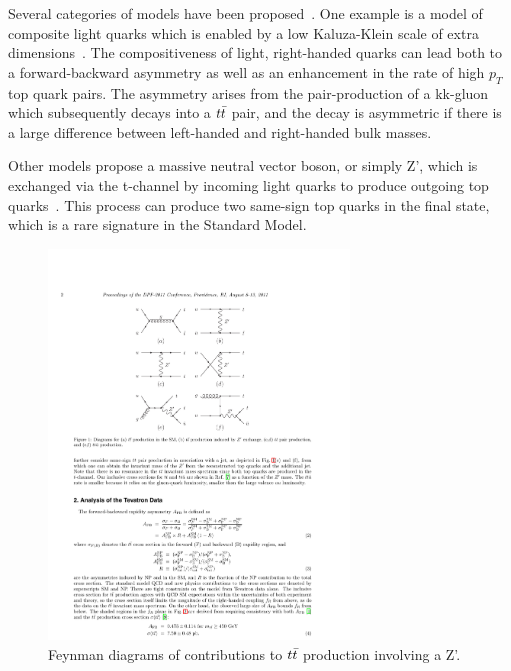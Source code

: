 Several categories of models have been proposed~\cite{Almeida:2008,Antunano:2008,Bowen:2006}.
One example is a model of composite light quarks which is enabled by a low Kaluza-Klein scale of extra dimensions~\cite{Delaunay:2011et}.  %
The compositiveness of light, right-handed quarks can lead both to a forward-backward asymmetry as well as an enhancement in the rate of high $p_T$ top quark pairs.
The asymmetry arises from the pair-production of a kk-gluon which subsequently decays into a $t\bar{t}$ pair, and the decay is asymmetric if there is a large difference between left-handed and right-handed bulk masses.

Other models propose a massive neutral vector boson, or simply Z', which is exchanged via the t-channel by incoming light quarks to produce outgoing top quarks~\cite{Berger:2011vi,Bhattacherjee:2011do}.
This process can produce two same-sign top quarks in the final state, which is a rare signature in the Standard Model.

\begin{figure}
  \begin{center}
    \includegraphics[width=80mm]{figures/theory/AsymmetryZPrimeModel}
  \end{center}
  \caption{Feynman diagrams of contributions to $t\bar{t}$ production involving a Z'.}
  \label{img:CDFAsymmetryMass}
\end{figure}

